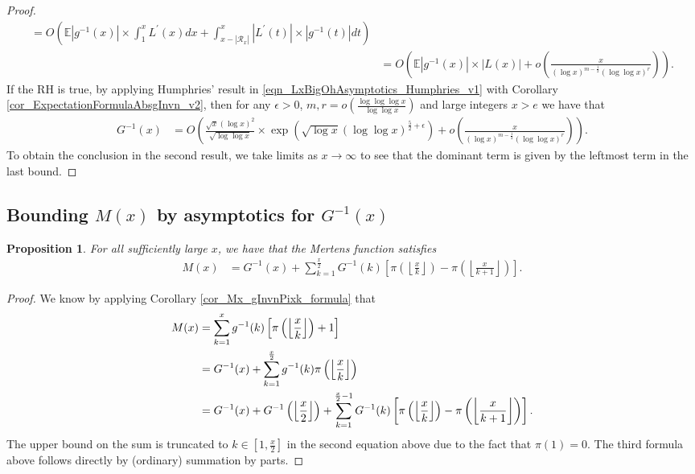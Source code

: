 \documentclass[11pt,reqno,a4letter]{article}
\numberwithin{figure}{section}
\numberwithin{table}{section}
\newcommand{\Floor}[2]{\ensuremath{\left\lfloor \frac{#1}{#2} \right\rfloor}}
\theoremstyle{plain}
\newtheorem{prop}[theorem]{Proposition}
\numberwithin{theorem}{section}
\theoremstyle{definition}
\begin{document}
\begin{proof}
\begin{align*}
     = O\left(\mathbb{E}|g^{-1}(x)| \times \int_1^x L^{\prime}(x) dx + 
     \int_{x-|\mathcal{R}_x|}^x |L^{\prime}(t)| \times |g^{-1}(t)| dt\right) \\ 
     & = O\left(\mathbb{E}|g^{-1}(x)| \times |L(x)| + 
     o\left(\frac{x}{(\log x)^{m-\frac{1}{2}} (\log\log x)^r}\right)\right). 
\end{align*} 
If the RH is true, by applying Humphries' result in 
\eqref{eqn_LxBigOhAsymptotics_Humphries_v1} with 
Corollary \ref{cor_ExpectationFormulaAbsgInvn_v2}, 
then for any $\epsilon > 0$, 
$m,r = o\left(\frac{\log\log\log x}{\log\log x}\right)$ and 
large integers $x > e$ we have that 
\begin{align*}
G^{-1}(x) & = O\left( 
     \frac{\sqrt{x} (\log x)^2}{\sqrt{\log\log x}} \times 
     \exp\left(\sqrt{\log x} (\log\log x)^{\frac{5}{2} + \epsilon}\right) + 
     o\left(\frac{x}{(\log x)^{m-\frac{1}{2}} (\log\log x)^r}\right) 
     \right). 
\end{align*}
To obtain the conclusion in the second result, we take limits as $x \rightarrow \infty$ 
to see that the dominant term is given by the leftmost term in the last bound. 
\end{proof} 

\subsection{Bounding $M(x)$ by asymptotics for $G^{-1}(x)$} 

\begin{prop} 
\label{prop_Mx_SBP_IntegralFormula} 
For all sufficiently large $x$, we have that the Mertens function satisfies 
\begin{align} 
\label{eqn_pf_tag_v2-restated_v2} 
M(x) & = G^{-1}(x) + 
     \sum_{k=1}^{\frac{x}{2}} G^{-1}(k) \left[ 
     \pi\left(\Floor{x}{k}\right) - \pi\left(\Floor{x}{k+1}\right) 
     \right]. 
\end{align} 
\end{prop} 
\begin{proof} 
We know by applying Corollary \ref{cor_Mx_gInvnPixk_formula} that 
\begin{align} 
\notag
M(x) & = \sum_{k=1}^{x} g^{-1}(k) \left[\pi\left(\Floor{x}{k}\right)+1\right] \\ 
\notag 
     & = G^{-1}(x) + \sum_{k=1}^{\frac{x}{2}} g^{-1}(k) \pi\left(\Floor{x}{k}\right) \\ 
\notag 
     & = G^{-1}(x) + G^{-1}\left(\Floor{x}{2}\right) + 
     \sum_{k=1}^{\frac{x}{2}-1} G^{-1}(k) \left[ 
     \pi\left(\Floor{x}{k}\right) - \pi\left(\Floor{x}{k+1}\right) 
     \right].
\end{align} 
The upper bound on the sum is truncated to $k \in \left[1, \frac{x}{2}\right]$ in the second equation 
above due to the fact that $\pi(1) = 0$. 
The third formula above follows directly by (ordinary) summation by parts. 
\end{proof} 
\end{document}
